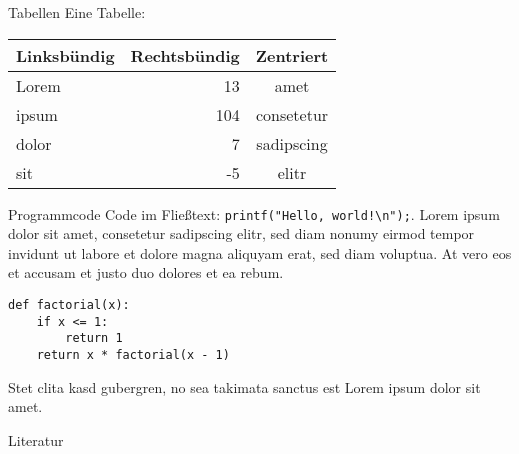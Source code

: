 \documentclass[a4paper, 10pt, twocolumn]{scrartcl}
\begin{document}

\begin{block}{Tabellen}
Eine Tabelle:

\begin{center}
\begin{tabular}{lrc}
\toprule
Linksbündig & Rechtsbündig & Zentriert \\
\midrule
Lorem &  13 & amet \\
ipsum & 104 & consetetur \\
dolor &   7 & sadipscing \\
sit   &  -5 & elitr \\
\bottomrule
\end{tabular}
\label{beispieltabelle}
\end{center}
\end{block}


\begin{block}{Programmcode}
Code im Fließtext: \lstinline{printf("Hello, world!\n");}. Lorem ipsum dolor sit amet, consetetur sadipscing elitr, sed diam nonumy eirmod tempor invidunt ut labore et dolore magna aliquyam erat, sed diam voluptua. At vero eos et accusam et justo duo dolores et ea rebum.

\begin{lstlisting}
def factorial(x):
    if x <= 1:
        return 1
    return x * factorial(x - 1)
\end{lstlisting}

Stet clita kasd gubergren, no sea takimata sanctus est Lorem ipsum dolor sit amet.
\end{block}

\begin{block}{Literatur}
\printbibliography[heading=none]
\end{block}
\end{document}
